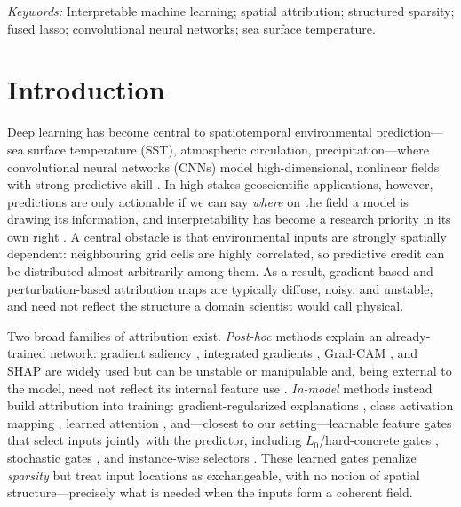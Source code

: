 \documentclass[12pt]{article}
\begin{document}
\noindent%
{\it Keywords:} Interpretable machine learning; spatial attribution; structured sparsity; fused lasso; convolutional neural networks; sea surface temperature. %

\vfill
\newpage
{}


\section{Introduction}\label{sec:intro}

Deep learning has become central to spatiotemporal environmental prediction---sea surface temperature (SST), atmospheric circulation, precipitation---where convolutional neural networks (CNNs) model high-dimensional, nonlinear fields with strong predictive skill \citep{Rasp2020WeatherBench,Bi2023PanguWeather,Pathak2022FourCastNet,Ham2019DLENSO}. In high-stakes geoscientific applications, however, predictions are only actionable if we can say \emph{where} on the field a model is drawing its information, and interpretability has become a research priority in its own right \citep{Toms2020PINN,Mamalakis2022Fidelity}. A central obstacle is that environmental inputs are strongly spatially dependent: neighbouring grid cells are highly correlated, so predictive credit can be distributed almost arbitrarily among them. As a result, gradient-based and perturbation-based attribution maps are typically diffuse, noisy, and unstable, and need not reflect the structure a domain scientist would call physical.

Two broad families of attribution exist. \emph{Post-hoc} methods explain an already-trained network: gradient saliency \citep{Simonyan2014Saliency}, integrated gradients \citep{Sundararajan2017IG}, Grad-CAM \citep{Selvaraju2017GradCAM}, and SHAP \citep{Lundberg2017SHAP} are widely used but can be unstable or manipulable and, being external to the model, need not reflect its internal feature use \citep{Adebayo2018Sanity,Ghorbani2019Fragile}. \emph{In-model} methods instead build attribution into training: gradient-regularized explanations \citep{Ross2017RRR,Ross2018GradReg}, class activation mapping \citep{Zhou2016CAM}, learned attention \citep{Hu2018SENet,Woo2018CBAM}, and---closest to our setting---learnable feature gates that select inputs jointly with the predictor, including $L_0$/hard-concrete gates \citep{Louizos2018L0}, stochastic gates \citep{Yamada2020STG}, and instance-wise selectors \citep{Chen2018L2X,Yoon2019INVASE}. These learned gates penalize \emph{sparsity} but treat input locations as exchangeable, with no notion of spatial structure---precisely what is needed when the inputs form a coherent field.
\end{document}
